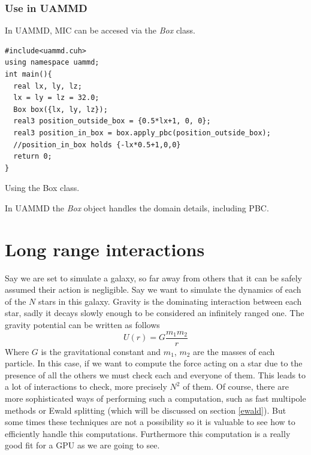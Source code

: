 \documentclass[ twoside,openright,titlepage,numbers=noenddot,%
headinclude,footinclude,cleardoublepage=empty,abstract=on,
BCOR=5mm,paper=a4,fontsize=11pt, dvipsnames
]{scrreprt}
\def\ucpp{uammd_cpp_lexer.py:UAMMDCppLexer -x}
\newcommand{\uammd}{\gls{UAMMD}\xspace}
\begin{document}
\subsection*{Use in UAMMD}
In \uammd, \gls{MIC} can be accesed via the \emph{Box} class.
\begin{listing}[H]
\begin{verbatim}
#include<uammd.cuh>
using namespace uammd;
int main(){
  real lx, ly, lz;
  lx = ly = lz = 32.0;
  Box box({lx, ly, lz});
  real3 position_outside_box = {0.5*lx+1, 0, 0};
  real3 position_in_box = box.apply_pbc(position_outside_box);
  //position_in_box holds {-lx*0.5+1,0,0}
  return 0; 
}
\end{verbatim}
\caption{Using the Box class.}
\label{code:box}
\end{listing}
In \uammd the \emph{Box} object handles the domain details, including \gls{PBC}.



\chapter{Long range interactions}
Say we are set to simulate a galaxy, so far away from others that it can be safely assumed their action is negligible. Say we want to simulate the dynamics of each of the $N$ stars in this galaxy. Gravity is the dominating interaction between each star, sadly it decays slowly enough to be considered an infinitely ranged one. The gravity potential can be written as follows
\begin{equation}
  \label{eq:gravity}
  U(r) = G\frac{m_1m_2}{r}
\end{equation}
Where $G$ is the gravitational constant and $m_1$, $m_2$ are the masses of each particle.
In this case, if we want to compute the force acting on a star due to the presence of all the others we must check each and everyone of them. This leads to a lot of interactions to check, more precisely $N^2$ of them. Of course, there are more sophisticated ways of performing such a computation, such as fast multipole methods \cite{fmm} or Ewald splitting (which will be discussed on section \ref{ewald}). But some times these techniques are not a possibility so it is valuable to see how to efficiently handle this computations.
Furthermore this computation is a really good fit for a \gls{GPU} as we are going to see.
\end{document}
